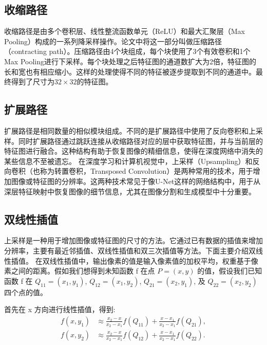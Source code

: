 \subsection{收缩路径}
收缩路径是由多个卷积层、线性整流函数单元（ReLU）和最大汇聚层（Max Pooling）构成的一系列降采样操作。论文中将这一部分叫做压缩路径（contracting path）。压缩路径由4个块组成，每个块使用了3个有效卷积和1个Max Pooling进行下采样。每个块处理之后特征图的通道数扩大为2倍，特征图的长和宽也有相应缩小。这样的处理使得不同的特征被逐步提取到不同的通道中。最终得到了尺寸为$32\times 32$的特征图。
\subsection{扩展路径}
扩展路径是相同数量的相似模块组成。不同的是扩展路径中使用了反向卷积和上采样。同时扩展路径通过跳跃连接从收缩路径对应的层中获取特征图，并与当前层的特征图进行融合。这种结构有助于恢复图像的精细信息，使得在深度网络中消失的某些信息不至被遗忘。
在深度学习和计算机视觉中，上采样（Upsampling）和反向卷积（也称为转置卷积，Transposed Convolution）是两种常用的技术，用于增加图像或特征图的分辨率。这两种技术常见于像U-Net这样的网络结构中，用于从深层特征映射中恢复图像的细节信息，尤其在图像分割和生成模型中十分重要。

\subsection{双线性插值}
上采样是一种用于增加图像或特征图的尺寸的方法。它通过已有数据的插值来增加分辨率，主要有最近邻插值、双线性插值和双三次插值等方法。下面主要介绍双线性插值。
在双线性插值中，输出像素的值是输入像素值的加权平均，权重基于像素之间的距离。假如我们想得到未知函数 f 在点 $P=\left( x, y\right)$ 的值，假设我们已知函数 f 在 $Q_{11} = \left( x_1, y_1 \right) $, $Q_{12} = \left( x_1, y_2 \right) $, $Q_{21} = \left( x_2, y_1 \right) $, 及 $Q_{22} = \left( x_2, y_2 \right) $ 四个点的值。 

首先在 x 方向进行线性插值，得到:
\begin{align}
f(x, y_1) &\approx \frac{x_2-x}{x_2-x_1} f(Q_{11}) + \frac{x-x_1}{x_2-x_1} f(Q_{21}), \\
f(x, y_2) &\approx \frac{x_2-x}{x_2-x_1} f(Q_{12}) + \frac{x-x_1}{x_2-x_1} f(Q_{22}).
\end{align}

